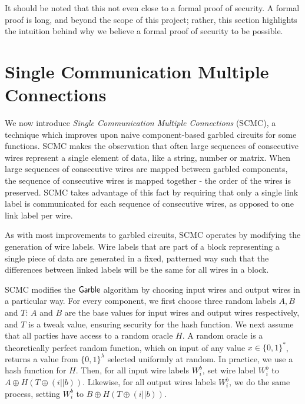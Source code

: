 It should be noted that this not even close to a formal proof of security.
A formal proof is long, and beyond the scope of this project; rather, this section highlights the intuition behind why we believe a formal proof of security to be possible. 

\section{Single Communication Multiple Connections}

We now introduce \textit{Single Communication Multiple Connections} (SCMC), a technique which improves upon naive component-based garbled circuits for some functions. 
SCMC makes the observation that often large sequences of consecutive wires represent a single element of data, like a string, number or matrix. 
When large sequences of consecutive wires are mapped between garbled components, the sequence of consecutive wires is mapped together - the order of the wires is preserved. 
SCMC takes advantage of this fact by requiring that only a single link label is communicated for each sequence of consecutive wires, as opposed to one link label per wire. 


As with most improvements to garbled circuits, SCMC operates by modifying the generation of wire labels. 
Wire labels that are part of a block representing a single piece of data are generated in a fixed, patterned way such that the differences between linked labels will be the same for all wires in a block. 

SCMC modifies the $\sf{Garble}$ algorithm by choosing input wires and output wires in a particular way. 
For every component, we first choose three random labels $A,B$ and $T$: $A$ and $B$ are the base values for input wires and output wires respectively, and $T$ is a tweak value, ensuring security for the hash function.
We next assume that all parties have access to a random oracle $H$. 
A random oracle is a theoretically perfect random function, which on input of any value $x \in \{0,1\}^*$, returns a value from $\{0,1\}^{\lambda}$ selected uniformly at random.
In practice, we use a hash function for $H$. 
Then, for all input wire labels $W_i^b$, set wire label $W_i^b$ to $A \oplus H(T \oplus (i || b))$. 
Likewise, for all output wires labels $W_i^b$, we do the same process, setting $W_i^b$ to $B \oplus H(T \oplus (i || b))$.


